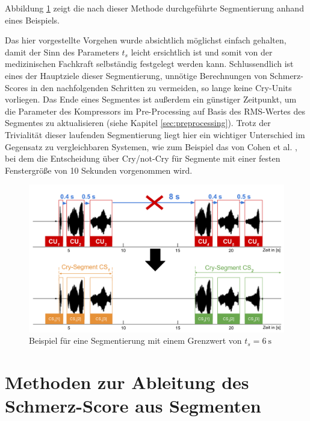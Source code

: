 Abbildung \ref{img:segmenting06} zeigt die nach dieser Methode durchgeführte Segmentierung anhand eines Beispiels.

Das hier vorgestellte Vorgehen wurde absichtlich möglichst einfach gehalten, damit der Sinn des Parameters $t_{s}$ leicht ersichtlich ist und somit von der medizinischen Fachkraft selbständig festgelegt werden kann. Schlussendlich ist eines der Hauptziele dieser Segmentierung, unnötige Berechnungen von Schmerz-Scores in den nachfolgenden Schritten zu vermeiden, so lange keine Cry-Units vorliegen. Das Ende eines Segmentes ist außerdem ein günstiger Zeitpunkt, um die Parameter des Kompressors im Pre-Processing auf Basis des RMS-Wertes des Segmentes zu aktualisieren (siehe Kapitel \ref{sec:preprocessing}). Trotz der Trivialität dieser laufenden Segmentierung liegt hier ein wichtiger Unterschied im Gegensatz zu vergleichbaren Systemen, wie zum Beispiel das von Cohen et al. \cite{cohenCry}, bei dem die Entscheidung über Cry/not-Cry für Segmente mit einer festen Fenstergröße von 10 Sekunden vorgenommen wird. 

\begin{figure}[H]
	\centering
	\includegraphics[width=1\textwidth]{bilder/segmentierung06.png}
	\caption{Beispiel für eine Segmentierung mit einem Grenzwert von $t_s = \SI{6}{\second}$}
	\label{img:segmenting06}
\end{figure}

\section{Methoden zur Ableitung des Schmerz-Score aus Segmenten}
\label{sec:overviewPainRegression}

